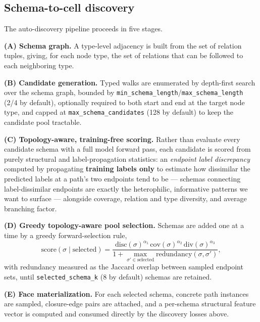 \documentclass{article}
\begin{document}
\subsection{Schema-to-cell discovery}
\label{sec:discovery}

The auto-discovery pipeline proceeds in five stages.

\textbf{(A) Schema graph.} A type-level adjacency is built from the set of relation tuples, giving,
for each node type, the set of relations that can be followed to each neighboring type.

\textbf{(B) Candidate generation.} Typed walks are enumerated by depth-first search over the schema
graph, bounded by \texttt{min\_schema\_length}/\texttt{max\_schema\_length} (2/4 by default),
optionally required to both start and end at the target node type, and capped at
\texttt{max\_schema\_candidates} (128 by default) to keep the candidate pool tractable.

\textbf{(C) Topology-aware, training-free scoring.} Rather than evaluate every candidate schema
with a full model forward pass, each candidate is scored from purely structural and
label-propagation statistics: an \emph{endpoint label discrepancy} computed by propagating
\textbf{training labels only} to estimate how dissimilar the predicted labels at a path's two
endpoints tend to be --- schemas connecting label-dissimilar endpoints are exactly the
heterophilic, informative patterns we want to surface --- alongside coverage, relation and type
diversity, and average branching factor.

\textbf{(D) Greedy topology-aware pool selection.} Schemas are added one at a time by a greedy
forward-selection rule,
\begin{equation}
  \mathrm{score}(\sigma \mid \text{selected}) = \frac{\mathrm{disc}(\sigma)^{\alpha_1}\, \mathrm{cov}(\sigma)^{\alpha_2}\, \mathrm{div}(\sigma)^{\alpha_3}}{1 + \max_{\sigma'\in\text{selected}}\mathrm{redundancy}(\sigma,\sigma')},
\end{equation}
with redundancy measured as the Jaccard overlap between sampled endpoint sets, until
\texttt{selected\_schema\_k} (8 by default) schemas are retained.

\textbf{(E) Face materialization.} For each selected schema, concrete path instances are sampled,
closure-edge pairs are attached, and a per-schema structural feature vector is computed and
consumed directly by the discovery losses above.
\end{document}
